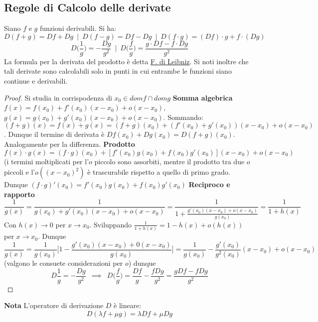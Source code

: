 \documentclass[10pt]{article}
\theoremstyle{plain}
\begin{document}
\subsection{Regole di Calcolo delle derivate}
\begin{prop}
Siano $f$ e $g$ funzioni derivabili. Si ha:
\[D(f + g) = Df + Dg \enspace | \enspace D(f-g) = Df - Dg \enspace | \enspace D(f \cdot g) = (Df) \cdot g + f \cdot (Dg)\] \[D \bigg(\frac{1}{g}\bigg) = - \frac{Dg}{g^2} \enspace | \enspace D \bigg(\frac{f}{g}\bigg) = \frac{g \cdot Df - f \cdot Dg}{g^2}\]
La formula per la derivata del prodotto è detta \underline{F. di Leibniz}. Si noti inoltre che tali derivate sono calcolabili solo in punti in cui entrambe le funzioni siano continue e derivabili.
\end{prop}
\begin{proof}
Si studia in corrispodenza di $x_0 \in dom f \cap dom g$
\textbf{Somma algebrica} $f(x) = f(x_0) + f'(x_0) (x-x_0) + o (x - x_0)$, $g(x) = g(x_0) + g'(x_0) (x-x_0) + o (x - x_0)$. Sommando: $(f+g)(x) = f(x) + g(x) = (f+g)(x_0) + (f'(x_0) + g'(x_0)) (x-x_0) + o (x-x_0)$. Dunque il termine di derivata è $Df(x_0) + Dg(x_0) = D(f+g)(x_0)$. Analogamente per la differenza.
\textbf{Prodotto} $f(x) \cdot g(x) = (f\cdot g)(x_0) + [f'(x_0)g(x_0) + f(x_0)g'(x_0)](x-x_0) + o(x -x_0)$ (i termini moltiplicati per l'$o$ piccolo sono assorbiti, mentre il prodotto tra due $o$ piccoli e l'$o((x-x_0)^2)$ è trascurabile rispetto a quello di primo grado. Dunque $(f\cdot g)'(x_0) = f'(x_0)g(x_0) + f(x_0)g'(x_0)$
\textbf{Reciproco e rapporto} 
\[\frac{1}{g(x)} = \frac{1}{g(x_0) + g'(x_0) (x-x_0) + o(x-x_0)} = \frac{1}{1 + \frac{g'(x_0)(x -x_0) + o(x-x_0)}{g(x_0)}} = \frac{1}{1+h(x)}\]
Con $h(x) \rightarrow 0$ per $x \rightarrow x_0$. Sviluppando $\frac{1}{1+h(x)} = 1 - h(x) + o(h(x))$ per $x \rightarrow x_0$. Dunque
\[\frac{1}{g(x)} = \frac{1}{g(x_0)}\bigg[1 - \frac{g'(x_0)(x-x_0) + 0(x-x_0)}{g(x_0)} \bigg] = \frac{1}{g(x_0)} - \frac{g'(x_0)}{g^2(x_0)}(x-x_0) + o(x-x_0)\]
(valgono le consuete considerazioni per $o$) dunque
\[D\frac{1}{g} = -\frac{Dg}{g^2} \enspace \implies \enspace D\bigg(\frac{f}{g}\bigg) = \frac{Df}{g} - \frac{fDg}{g^2} = \frac{gDf - f Dg}{g^2}\]
\end{proof}

\textbf{Nota} L'operatore di derivazione $D$ è lineare:
\[D ( \lambda f + \mu g) = \lambda D f + \mu D g\]
\end{document}
